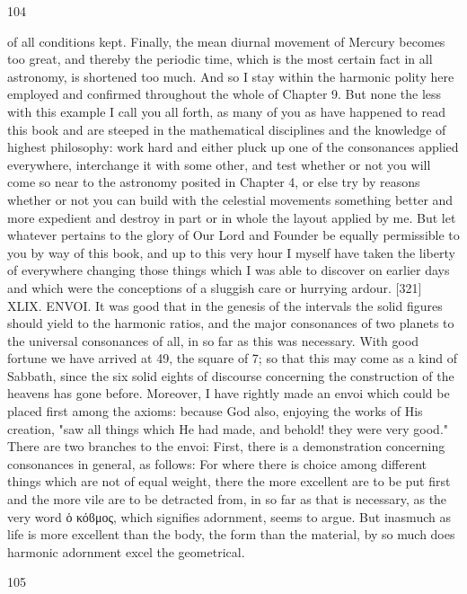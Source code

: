 \documentclass{article}
\begin{document}
104

of all conditions kept. Finally, the mean diurnal movement of Mercury
becomes too great, and thereby the periodic time, which is the most
certain fact in all astronomy, is shortened too much. And so I stay within
the harmonic polity here employed and confirmed throughout the whole
of Chapter 9. But none the less with this example I call you all forth, as
many of you as have happened to read this book and are steeped in the
mathematical disciplines and the knowledge of highest philosophy: work
hard and either pluck up one of the consonances applied everywhere,
interchange it with some other, and test whether or not you will come so
near to the astronomy posited in Chapter 4, or else try by reasons
whether or not you can build with the celestial movements something
better and more expedient and destroy in part or in whole the layout
applied by me. But let whatever pertains to the glory of Our Lord and
Founder be equally permissible to you by way of this book, and up to this
very hour I myself have taken the liberty of everywhere changing those
things which I was able to discover on earlier days and which were the
conceptions of a sluggish care or hurrying ardour.
[321] XLIX. ENVOI. It was good that in the genesis of the intervals the
solid figures should yield to the harmonic ratios, and the major
consonances of two planets to the universal consonances of all, in so far
as this was necessary.
With good fortune we have arrived at 49, the square of 7; so that this
may come as a kind of Sabbath, since the six solid eights of discourse
concerning the construction of the heavens has gone before. Moreover, I
have rightly made an envoi which could be placed first among the
axioms: because God also, enjoying the works of His creation, "saw all
things which He had made, and behold! they were very good."
There are two branches to the envoi: First, there is a demonstration
concerning consonances in general, as follows: For where there is choice
among different things which are not of equal weight, there the more
excellent are to be put first and the more vile are to be detracted from, in
so far as that is necessary, as the very word ὁ κόϐμος, which
signifies adornment, seems to argue. But inasmuch as life is more
excellent than the body, the form than the material, by so much does
harmonic adornment excel the geometrical.


105
\end{document}
